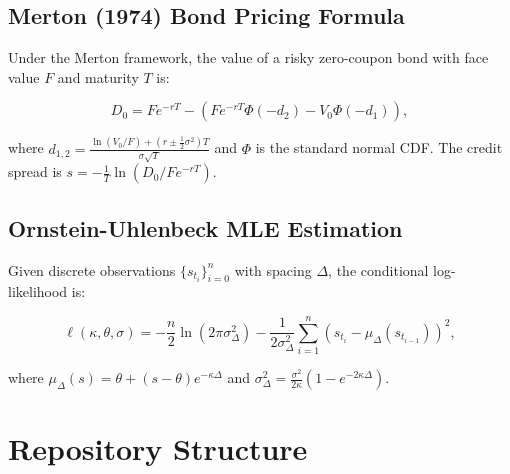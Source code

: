 \documentclass[12pt, a4paper]{article}
\theoremstyle{definition}
\begin{document}
\subsection{Merton (1974) Bond Pricing Formula}

Under the Merton framework, the value of a risky zero-coupon bond with face value
$F$ and maturity $T$ is:

\begin{equation}
  D_0 = F e^{-rT} - (F e^{-rT} \Phi(-d_2) - V_0 \Phi(-d_1)),
\end{equation}

where $d_{1,2} = \frac{\ln(V_0/F) + (r \pm \frac{1}{2}\sigma^2)T}{\sigma\sqrt{T}}$
and $\Phi$ is the standard normal CDF.
The credit spread is $s = -\frac{1}{T}\ln(D_0 / Fe^{-rT})$.

\subsection{Ornstein-Uhlenbeck MLE Estimation}

Given discrete observations $\{s_{t_i}\}_{i=0}^{n}$ with spacing $\Delta$, the
conditional log-likelihood is:

\begin{equation}
  \ell(\kappa, \theta, \sigma) = -\frac{n}{2}\ln(2\pi\sigma_\Delta^2)
    - \frac{1}{2\sigma_\Delta^2}\sum_{i=1}^{n}
    \!\left(s_{t_i} - \mu_\Delta(s_{t_{i-1}})\right)^{\!2},
\end{equation}

where $\mu_\Delta(s) = \theta + (s-\theta)e^{-\kappa\Delta}$ and
$\sigma_\Delta^2 = \frac{\sigma^2}{2\kappa}(1 - e^{-2\kappa\Delta})$.

\section{Repository Structure}
\end{document}
